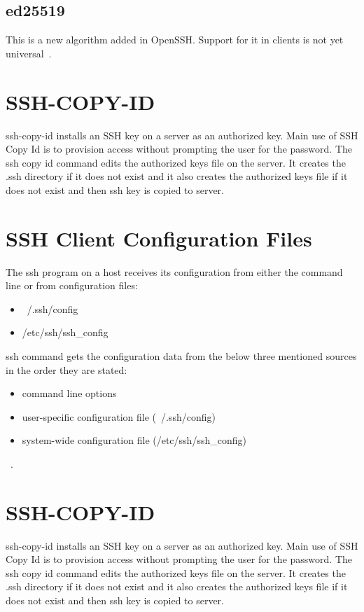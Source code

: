 \subsection{ed25519}
This is a new algorithm added in OpenSSH. Support for it in clients
is not yet universal~\cite{hid-sp18-513-sshkeyinc}. 

\section{SSH-COPY-ID}
ssh-copy-id installs an SSH key on a server as an authorized key. 
Main use of SSH Copy Id is to provision access without prompting
the user for the password. The ssh copy id command edits the 
authorized keys file on the server. It creates the .ssh directory 
if it does not exist and it also creates the authorized keys file
if it does not exist and then ssh key is copied to server.

\section{SSH Client Configuration Files}
The ssh program on a host receives its configuration from either
the command line or from configuration files:
\begin{itemize}
\item ~/.ssh/config
\item /etc/ssh/ssh\_config
\end{itemize}

ssh command gets the configuration data from the below three 
mentioned sources in the order they are stated:

\begin{itemize}
\item command line options
\item user-specific configuration file (~/.ssh/config)
\item system-wide configuration file (/etc/ssh/ssh\_config)
\end{itemize}
~\cite{hid-sp18-513-sshkeyinc}. 

\section{SSH-COPY-ID}
ssh-copy-id installs an SSH key on a server as an authorized key. 
Main use of SSH Copy Id is to provision access without prompting
the user for the password. The ssh copy id command edits the 
authorized keys file on the server. It creates the .ssh directory 
if it does not exist and it also creates the authorized keys file
if it does not exist and then ssh key is copied to server.


